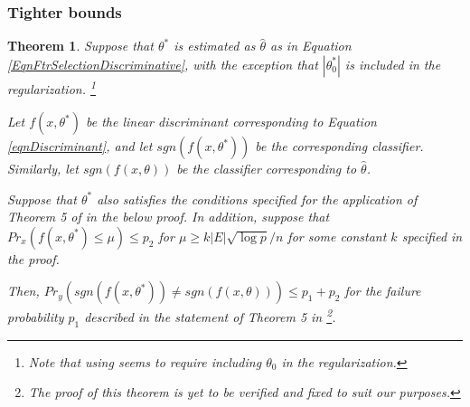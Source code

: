 \documentclass{article}
\newtheorem{theorem}{Theorem}
\def\edge{\ensuremath{E}}
\def\thetaEst{\hat{\theta}}
\begin{document}
\subsubsection{Tighter bounds}
\begin{theorem}
\label{thmMarginAnalysisDiscriminative}
 Suppose that $\theta^*$ is estimated as $\thetaEst$ as in Equation \ref{EqnFtrSelectionDiscriminative}, with the exception that $|\theta_0^*|$ is included in the regularization. \footnote{Note that using \cite{BachSelfConcordant} seems to require including $\theta_0$ in the regularization.}


Let $f(x, \theta^*)$ be the linear discriminant corresponding to Equation \ref{eqnDiscriminant}, and let $sgn(f(x, \theta^*))$ be the corresponding classifier. Similarly, let $sgn(f(x, \theta))$ be the classifier corresponding to $\thetaEst$.

Suppose that $\theta^*$ also satisfies the conditions specified for the application of Theorem 5 of \cite{BachSelfConcordant} in the below proof. In addition, suppose that $Pr_x(f(x, \theta^*) \leq \mu) \leq p_2$ for $\mu \geq k |\edge|\sqrt{\log p}/n$ for some constant $k$ specified in the proof.

Then, $Pr_y(sgn(f(x, \theta^*)) \neq sgn(f(x, \theta))) \leq p_1 + p_2$ for the failure probability $p_1$ described in the statement of Theorem 5 in \cite{BachSelfConcordant} \footnote{The proof of this theorem is yet to be verified and fixed to suit our purposes.}.
\end{theorem}
\end{document}
